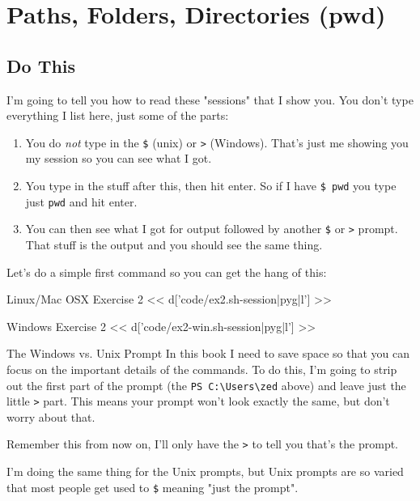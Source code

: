 \chapter{Paths, Folders, Directories (pwd)}

\section{Do This}

I'm going to tell you how to read these "sessions" that I show you.  You don't
type everything I list here, just some of the parts:

\begin{enumerate} 
\item You do \emph{not} type in the \verb|$| (unix) or
    \verb|>| (Windows).  That's just me showing you my session so you can see what
    I got.
\item You type in the stuff after this, then hit enter.  So if I have \verb|$ pwd| you type just \verb|pwd| and hit enter.
\item You can then see what I got for output followed by another \verb|$| or \verb|>| prompt.  That stuff is the output and you should see the same thing.
\end{enumerate}

Let's do a simple first command so you can get the hang of this:

\begin{code}{Linux/Mac OSX Exercise 2}
<< d['code/ex2.sh-session|pyg|l'] >>
\end{code}

\begin{code}{Windows Exercise 2}
<< d['code/ex2-win.sh-session|pyg|l'] >>
\end{code}

\begin{aside}{The Windows vs. Unix Prompt}
In this book I need to save space so that you can focus on the important
details of the commands.  To do this, I'm going to strip out the 
first part of the prompt (the \verb|PS C:\Users\zed| above) and leave
just the little \verb|>| part.  This means your prompt won't look
exactly the same, but don't worry about that.

Remember this from now on, I'll only have the \verb|>| to tell you
that's the prompt.

I'm doing the same thing for the Unix prompts, but Unix prompts are so
varied that most people get used to \verb|$| meaning "just the prompt".
\end{aside}


